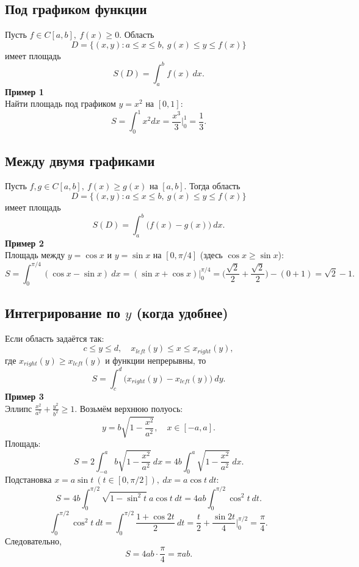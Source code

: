 \documentclass[14pt]{extreport}
\begin{document}
    \subsection{Под графиком функции}
    Пусть $f \in C[a,b],\ f(x) \geq 0$. Область
    \[
    D = \{ (x,y): a \leq x \leq b,\ g(x) \leq y \leq f(x) \}
    \]
    имеет площадь
    \[
    S(D) = \int_a^b f(x)\ dx.
    \]
    \textbf{Пример 1}\\
    Найти площадь под графиком $y = x^2$ на $[0,1]$:
    \[
    S = \int_0^1 x^2dx = \frac{x^3}{3} \Bigr|_0^1 = \frac{1}{3}.
    \]

    \subsection{Между двумя графиками}
    Пусть $f,g \in C[a,b],\ f(x) \geq g(x)$ на $[a,b]$. Тогда область 
    \[
    D = \{ (x,y): a \leq x \leq b,\ g(x) \leq y \leq f(x) \}
    \]
    имеет площадь
    \[
    S(D) = \int_a^b \bigl( f(x)-g(x) \bigr)\ dx.
    \]
    \textbf{Пример 2}\\
    Площадь между $y = \cos x$ и $y = \sin x$ на $[0, \pi/4]$ (здесь $\cos x \geq \sin x$):
    \[
    S = \int_0^{\pi/4} (\cos x - \sin x)\ dx = (\sin x + \cos x) \bigr|_0^{\pi/4} = \Bigg( \frac{\sqrt{2}}{2} + \frac{\sqrt{2}}{2} \Bigg) - (0+1) = \sqrt{2} - 1.
    \]

    \subsection{Интегрирование по $y$ (когда удобнее)}
    Если область задаётся так:
    \[
    c \leq y \leq d, \quad x_{left}(y) \leq x \leq x_{right}(y),
    \]
    где $x_{right}(y) \geq x_{left}(y)$ и функции непрерывны, то
    \[
    S = \int_c^d \bigl( x_{right}(y) - x_{left}(y) \bigr)\ dy.
    \]
    \textbf{Пример 3}\\
    Эллипс  $\frac{x^2}{a^2} + \frac{y^2}{b^2} \geq 1$. Возьмём верхнюю полуось:
    \[
    y = b \sqrt{1 - \frac{x^2}{a^2}}, \quad x \in [-a,a].
    \]
    Площадь:
    \[
    S = 2\int_{-a}^a b \sqrt{1 - \frac{x^2}{a^2}}\ dx = 4b\int_0^a \sqrt{1 - \frac{x^2}{a^2}}\ dx.
    \]
    Подстановка $x = a\sin t\ (t \in [0,\pi/2]),\ dx = a\cos t\ dt$:
    \[
    S = 4b\int_0^{\pi/2} \sqrt{1 - \sin^2 t}\ a\cos t\ dt = 4ab \int_0^{\pi/2} \cos^2 t\ dt.
    \]
    \[
    \int_0^{\pi/2} \cos^2 t\ dt = \int_0^{\pi/2} \frac{1 + \cos 2t}{2}\ dt = \frac{t}{2} + \frac{\sin 2t}{4} \Bigr|_0^{\pi/2} = \frac{\pi}{4}.
    \]
    Следовательно, 
    \[
    S = 4ab \cdot \frac{\pi}{4} = \pi ab.
    \]
\end{document}
